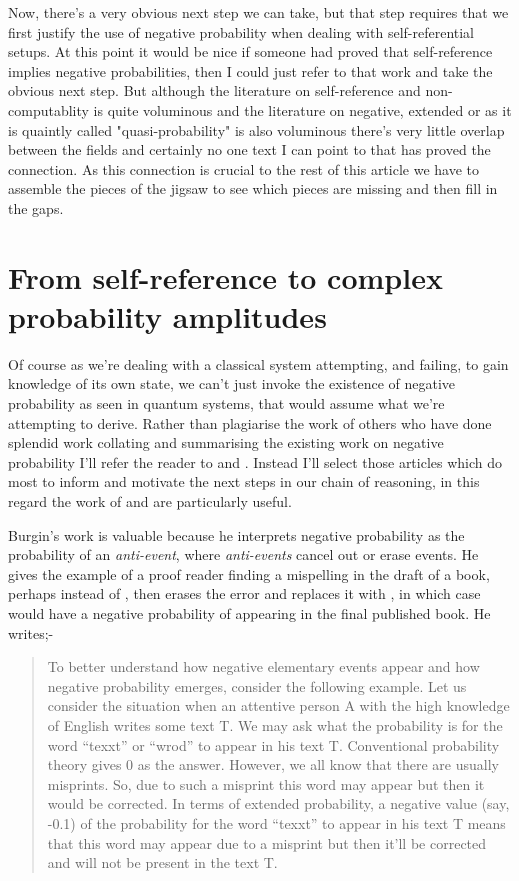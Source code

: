 \documentclass{article}
\begin{document}
Now, there's a very obvious next step we can take, but that step requires that we first justify the use of negative probability when dealing with self-referential setups. At this point it would be nice if someone had proved that self-reference implies negative probabilities, then I could just refer to that work and take the obvious next step. But although the literature on self-reference and non-computablity is quite voluminous and the literature on negative, extended or as it is quaintly called "quasi-probability" is also voluminous there's very little overlap between the fields and certainly no one text I can point to that has proved the connection. As this connection is crucial to the rest of this article we have to assemble the pieces of the jigsaw to see which pieces are missing and then fill in the gaps.

\section{From self-reference to complex probability amplitudes}

Of course as we're dealing with a classical system attempting, and failing, to gain knowledge of its own state, we can't just invoke the existence of negative probability as seen in quantum systems, that would assume what we're attempting to derive. Rather than plagiarise the work of others who have done splendid work collating and summarising the existing work on negative probability I'll refer the reader to \autocite{burgin_2009, burgin2010interpretations} and \autocite{muckenheim_1986}. Instead I'll select those articles which do most to inform and motivate the next steps in our chain of reasoning, in this regard the work of \autocite{burgin2010interpretations} and \autocite{aaronson_lect9,Aaronson:dem} are particularly useful. 

Burgin's work is valuable because he interprets negative probability as the probability of an \emph{anti-event}, where \emph{anti-events} cancel out or erase events. He gives the example of a proof reader finding a mispelling in the draft of a book, perhaps  instead of , then erases the error and replaces it with , in which case  would have a negative probability of appearing in the final published book.
He writes;-
\begin{quotation}
    To better understand how negative elementary events appear and how negative probability emerges, consider the following example. Let us consider the situation when an attentive person A with the high knowledge of English writes some text T. We may ask what the probability is for the word “texxt” or “wrod” to appear in his text T. Conventional probability theory gives 0 as the answer. However, we all know that there are usually misprints. So, due to such a misprint this word may appear but then it would be corrected. In terms of extended probability, a negative value (say, -0.1) of the probability for the word “texxt” to appear in his text T means that this word may appear due to a misprint but then it’ll be corrected and will not be present in the text T. 
    \hfill \autocite{burgin2010interpretations}
\end{quotation}
\end{document}
